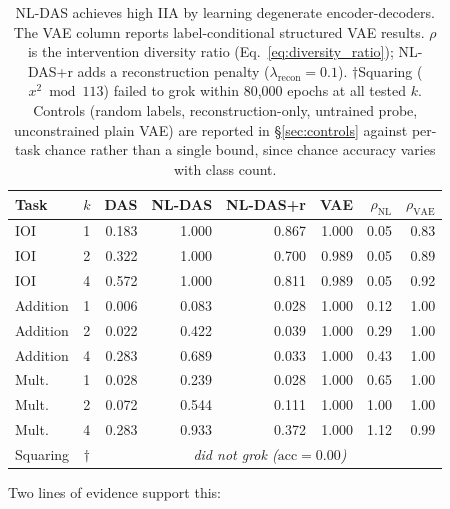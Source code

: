 \documentclass{article}
\begin{document}
\begin{table}[t]
\centering
\small
\setlength{\tabcolsep}{3pt}
\begin{tabular}{lc rrrr rr}
\toprule
Task & $k$ & DAS & NL-DAS & NL-DAS+r & VAE & $\rho_\text{NL}$ & $\rho_\text{VAE}$ \\
\midrule
IOI & 1 & 0.183 & 1.000 & 0.867 & 1.000 & 0.05 & 0.83 \\
IOI & 2 & 0.322 & 1.000 & 0.700 & 0.989 & 0.05 & 0.89 \\
IOI & 4 & 0.572 & 1.000 & 0.811 & 0.989 & 0.05 & 0.92 \\
\midrule
Addition & 1 & 0.006 & 0.083 & 0.028 & 1.000 & 0.12 & 1.00 \\
Addition & 2 & 0.022 & 0.422 & 0.039 & 1.000 & 0.29 & 1.00 \\
Addition & 4 & 0.283 & 0.689 & 0.033 & 1.000 & 0.43 & 1.00 \\
\midrule
Mult.\ & 1 & 0.028 & 0.239 & 0.028 & 1.000 & 0.65 & 1.00 \\
Mult.\ & 2 & 0.072 & 0.544 & 0.111 & 1.000 & 1.00 & 1.00 \\
Mult.\ & 4 & 0.283 & 0.933 & 0.372 & 1.000 & 1.12 & 0.99 \\
\midrule
Squaring & $\dagger$ & \multicolumn{6}{c}{\emph{did not grok ($\text{acc} = 0.00$)}} \\
\bottomrule
\end{tabular}
\caption{NL-DAS achieves high IIA by learning degenerate encoder-decoders.
  The VAE column reports label-conditional structured VAE results.
  $\rho$ is the intervention diversity ratio (Eq.~\ref{eq:diversity_ratio});
  NL-DAS+r adds a reconstruction penalty ($\lambda_\text{recon} = 0.1$).
  $\dagger$Squaring ($x^2 \bmod 113$) failed to grok within 80{,}000 epochs
  at all tested $k$.
  Controls (random labels, reconstruction-only, untrained probe, unconstrained
  plain VAE) are reported in \S\ref{sec:controls} against per-task chance
  rather than a single bound, since chance accuracy varies with class count.}
\label{tab:nldas_vacuous}
\end{table}

Two lines of evidence support this:
\end{document}
